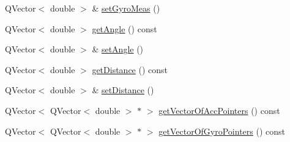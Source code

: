 \begin{DoxyCompactItemize}
\item 
Q\+Vector$<$ double $>$ \& \mbox{\hyperlink{class_measurement_handler_a56f38156d0bcbe80fe7a4f07f7df8c04}{set\+Gyro\+Meas}} ()
\item 
Q\+Vector$<$ double $>$ \mbox{\hyperlink{class_measurement_handler_a95251b5abed0a716be546e4c58f48910}{get\+Angle}} () const
\item 
Q\+Vector$<$ double $>$ \& \mbox{\hyperlink{class_measurement_handler_a4ba0133931c03ce76c0778cce53f0036}{set\+Angle}} ()
\item 
Q\+Vector$<$ double $>$ \mbox{\hyperlink{class_measurement_handler_a4d4422673f5deb300499051df34dec30}{get\+Distance}} () const
\item 
Q\+Vector$<$ double $>$ \& \mbox{\hyperlink{class_measurement_handler_aaefca8d2644ed80b6318c7014cde5a57}{set\+Distance}} ()
\item 
Q\+Vector$<$ Q\+Vector$<$ double $>$ $\ast$ $>$ \mbox{\hyperlink{class_measurement_handler_a18ae7fd0f8f2ed3e74e9a7cb87af92e3}{get\+Vector\+Of\+Acc\+Pointers}} () const
\item 
Q\+Vector$<$ Q\+Vector$<$ double $>$ $\ast$ $>$ \mbox{\hyperlink{class_measurement_handler_a15b2c74a4325c0ade1dd92f2b4afdabd}{get\+Vector\+Of\+Gyro\+Pointers}} () const
\end{DoxyCompactItemize}
